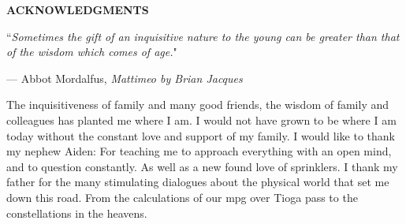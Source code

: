 \documentclass[12pt,notitlepage]{report}
\begin{document}
\ifcopyright\copyrightpage\fi
\ifhavededication\dedicationpage\fi
\newpage
\renewcommand\contentsname{\begin{center}  \vspace{-2.5cm}{\Large TABLE \ OF \ CONTENTS}\vspace{-1.5cm} \end{center}}
\renewcommand\listfigurename{\vspace{-2.5cm}{\begin{center}{\Large LIST \ OF \ FIGURES} \end{center}} \vspace{-0.5cm}}
\renewcommand\listtablename{\begin{center} \vspace{-2.5cm}{\Large LIST \ OF \ TABLES}\vspace{-0.5cm} \end{center}}


\tableofcontents

\afterpreface

\newpage

\begin{center}
{\Large \bf ACKNOWLEDGMENTS}
\end{center}


\singlespace
\epigraph{``\emph{Sometimes the gift of an inquisitive nature to the young can be greater than that of the wisdom which comes of age.}"}{--- \textup{Abbot Mordalfus}, \textit{Mattimeo by Brian Jacques}}

\dblspace
The inquisitiveness of family and many good friends, the wisdom of family and colleagues has planted me where I am.
I would not have grown to be where I am today without the constant love and support of my family. 
I would like to thank my nephew Aiden: For teaching me to approach everything with an open mind, and to question constantly.
As well as a new found love of sprinklers.
I thank my father for the many stimulating dialogues about the physical world that set me down this road.
From the calculations of our mpg over Tioga pass to the constellations in the heavens.
\end{document}
